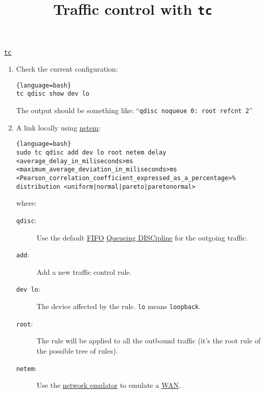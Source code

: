 
\title{Traffic control with \texttt{tc}}

\maketitle
\tableofcontents

\href{https://man7.org/linux/man-pages/man8/tc.8.html}{\texttt{tc}} \cite{bert2012lartc}

\begin{enumerate}

\item Check the current configuration:
  
  \begin{lstlisting}{language=bash}
tc qdisc show dev lo
  \end{lstlisting}
  
  The output should be something like: ``\texttt{qdisc noqueue 0: root
    refcnt 2}''

\item A link locally using
  \href{https://man7.org/linux/man-pages/man8/tc-netem.8.html}{netem}:

  \begin{lstlisting}{language=bash}
sudo tc qdisc add dev lo root netem delay <average_delay_in_miliseconds>ms <maximum_average_deviation_in_miliseconds>ms <Pearson_correlation_coefficient_expressed_as_a_percentage>% distribution <uniform|normal|pareto|paretonormal>
  \end{lstlisting}
  where:
  \begin{description}
  \item [\texttt{qdisc}:] Use the default
    \href{https://en.wikipedia.org/wiki/FIFO_(computing_and_electronics)}{FIFO}
    \href{https://wiki.debian.org/TrafficControl}{Queueing DISCipline}
    for the outgoing traffic.
  \item [\texttt{add}:] Add a new traffic control rule.
  \item [\texttt{dev lo}:] The device affected by the
    rule. \verb|lo| means \verb|loopback|.
  \item [\texttt{root}:] The rule will be applied to all the outbound
    traffic (it's the root rule of the possible tree of rules).
  \item [\texttt{netem}:] Use the
    \href{https://wiki.linuxfoundation.org/networking/netem}{network
      emulator} to emulate a
    \href{https://en.wikipedia.org/wiki/Wide_area_network}{WAN}.
  \end{description}


\end{enumerate}
